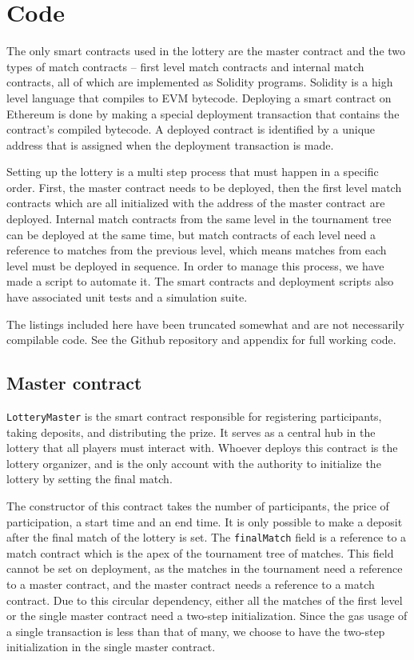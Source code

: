 \section{Code}
\label{sec:code}

The only smart contracts used in the lottery are the master contract and the two types of match contracts – first level match contracts and internal match contracts, all of which are implemented as Solidity programs. Solidity is a high level language that compiles to EVM bytecode. Deploying a smart contract on Ethereum is done by making a special deployment transaction that contains the contract's compiled bytecode. A deployed contract is identified by a unique address that is assigned when the deployment transaction is made.

Setting up the lottery is a multi step process that must happen in a specific order. First, the master contract needs to be deployed, then the first level match contracts which are all initialized with the address of the master contract are deployed. Internal match contracts from the same level in the tournament tree can be deployed at the same time, but match contracts of each level need a reference to matches from the previous level, which means matches from each level must be deployed in sequence. In order to manage this process, we have made a script to automate it. The smart contracts and deployment scripts also have associated unit tests and a simulation suite.

The listings included here have been truncated somewhat and are not necessarily compilable code. See the Github repository and appendix for full working code.

\subsection{Master contract}
\texttt{LotteryMaster} is the smart contract responsible for registering participants, taking deposits, and distributing the prize. It serves as a central hub in the lottery that all players must interact with. Whoever deploys this contract is the lottery organizer, and is the only account with the authority to initialize the lottery by setting the final match. 

The constructor of this contract takes the number of participants, the price of participation, a start time and an end time. It is only possible to make a deposit after the final match of the lottery is set. The \texttt{finalMatch} field is a reference to a match contract which is the apex of the tournament tree of matches. This field cannot be set on deployment, as the matches in the tournament need a reference to a master contract, and the master contract needs a reference to a match contract. Due to this circular dependency, either all the matches of the first level or the single master contract need a two-step initialization. Since the gas usage of a single transaction is less than that of many, we choose to have the two-step initialization in the single master contract.

